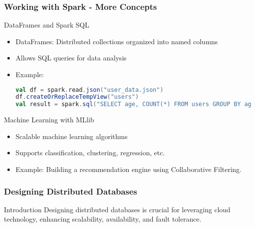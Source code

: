 \documentclass[aspectratio=169]{beamer}
\begin{document}
\begin{frame}[fragile]
    \frametitle{Working with Spark - More Concepts}
    \begin{block}{DataFrames and Spark SQL}
        \begin{itemize}
            \item DataFrames: Distributed collections organized into named columns
            \item Allows SQL queries for data analysis
            \item Example: 
            \begin{lstlisting}[language=Scala]
val df = spark.read.json("user_data.json")
df.createOrReplaceTempView("users")
val result = spark.sql("SELECT age, COUNT(*) FROM users GROUP BY age")
            \end{lstlisting}
        \end{itemize}
    \end{block}
    
    \begin{block}{Machine Learning with MLlib}
        \begin{itemize}
            \item Scalable machine learning algorithms
            \item Supports classification, clustering, regression, etc.
            \item Example: Building a recommendation engine using Collaborative Filtering.
        \end{itemize}
    \end{block}
\end{frame}

\begin{frame}
    \frametitle{Designing Distributed Databases}
    \begin{block}{Introduction}
        Designing distributed databases is crucial for leveraging cloud technology, enhancing scalability, availability, and fault tolerance. 
    \end{block}
\end{frame}
\end{document}
